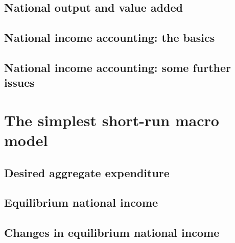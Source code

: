 \documentclass[10pt, twocolumn]{article}
\begin{document}
\subsection{National output and value added}



\subsection{National income accounting: the basics}



\subsection{National income accounting: some further issues}



\section{The simplest short-run macro model}
\subsection{Desired aggregate expenditure}



\subsection{Equilibrium national income}



\subsection{Changes in equilibrium national income}
\end{document}
